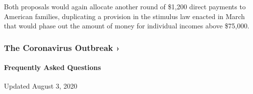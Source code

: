 Both proposals would again allocate another round of \$1,200 direct
payments to American families, duplicating a provision in the stimulus
law enacted in March that would phase out the amount of money for
individual incomes above \$75,000.

\href{https://www.nytimes.com/news-event/coronavirus?action=click\&pgtype=Article\&state=default\&region=MAIN_CONTENT_3\&context=storylines_faq}{}

\hypertarget{the-coronavirus-outbreak-}{%
\subsubsection{The Coronavirus Outbreak
›}\label{the-coronavirus-outbreak-}}

\hypertarget{frequently-asked-questions}{%
\paragraph{Frequently Asked
Questions}\label{frequently-asked-questions}}

Updated August 3, 2020

